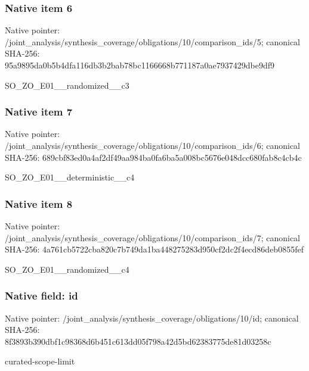 \documentclass[10pt,a4paper]{article}
\begin{document}
\subsubsection{Native item 6}
Native pointer: /joint\_\allowbreak{}analysis/synthesis\_\allowbreak{}coverage/obligations/10/comparison\_\allowbreak{}ids/5; canonical SHA-256: 95a9895da0b5b4dfa116db3b2bab78bc1166668b771187a0ae7937429dbe9df9

\begingroup\raggedright\sloppy SO\_\allowbreak{}ZO\_\allowbreak{}E01\_\allowbreak{}\_\allowbreak{}randomized\_\allowbreak{}\_\allowbreak{}c3\par\endgroup

\subsubsection{Native item 7}
Native pointer: /joint\_\allowbreak{}analysis/synthesis\_\allowbreak{}coverage/obligations/10/comparison\_\allowbreak{}ids/6; canonical SHA-256: 689cbf83ed0a4af2df49aa984ba0fa6ba5a008bc5676e048dcc680fab8c4cb4c

\begingroup\raggedright\sloppy SO\_\allowbreak{}ZO\_\allowbreak{}E01\_\allowbreak{}\_\allowbreak{}deterministic\_\allowbreak{}\_\allowbreak{}c4\par\endgroup

\subsubsection{Native item 8}
Native pointer: /joint\_\allowbreak{}analysis/synthesis\_\allowbreak{}coverage/obligations/10/comparison\_\allowbreak{}ids/7; canonical SHA-256: 4a761cb5722cba820c7b749da1ba448275283d950cf2dc2f4ecd86deb0855fef

\begingroup\raggedright\sloppy SO\_\allowbreak{}ZO\_\allowbreak{}E01\_\allowbreak{}\_\allowbreak{}randomized\_\allowbreak{}\_\allowbreak{}c4\par\endgroup

\subsubsection{Native field: id}
Native pointer: /joint\_\allowbreak{}analysis/synthesis\_\allowbreak{}coverage/obligations/10/id; canonical SHA-256: 8f3893b390dbf1c98368d6b451c613dd05f798a42d5bd62383775de81d03258c

\begingroup\raggedright\sloppy curated-scope-limit\par\endgroup
\end{document}
